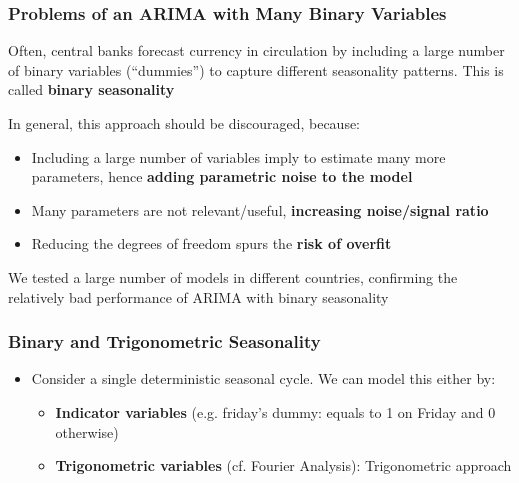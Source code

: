 \documentclass{beamer}
\newenvironment{wideitemize}{\itemize\addtolength{\itemsep}{10pt}}{\enditemize}
\begin{document}
\begin{frame}
  \frametitle{Problems of an ARIMA with Many Binary Variables}

  \begin{wideitemize}
  \item Often, central banks forecast currency in circulation by including a large number of binary variables (“dummies”) to capture different seasonality patterns. This is called \textbf{binary seasonality}

  \item In general, this approach should be discouraged, because:
    \begin{itemize}
    \item Including a large number of variables imply to estimate many more parameters, hence \textbf{adding parametric noise to the model}
    \item Many parameters are not relevant/useful, \textbf{increasing noise/signal ratio}
    \item Reducing the degrees of freedom spurs the \textbf{risk of overfit}
    \end{itemize}
    
  \item We tested a large number of models in different countries, confirming the relatively bad performance of ARIMA with binary seasonality
    
  \end{wideitemize}

\end{frame}



\begin{frame}
  \frametitle{Binary and Trigonometric Seasonality}
  \begin{itemize}
  \item Consider a single deterministic seasonal cycle. We can model this either by:
    \begin{itemize}
      \item \textbf{Indicator variables} (e.g. friday's dummy: equals to 1 on Friday and 0 otherwise)
      \item \textbf{Trigonometric variables} (cf. Fourier Analysis): Trigonometric approach
    \end{itemize}
  \end{itemize}
\end{frame}
\end{document}
